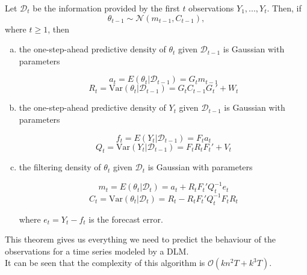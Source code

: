 \documentclass{article}
\begin{document}
\begin{theorem}
Let $\mathcal{D}_t$ be the information provided by the first $t$ observations $Y_1, ..., Y_t$.
Then, if
$$\theta_{t-1} \sim \mathcal{N}(m_{t-1}, C_{t-1}),$$
where $t \ge 1$, then

\begin{enumerate}[(a)]

\item the one-step-ahead predictive density of $\theta_t$ given $\mathcal{D}_{t-1}$ is Gaussian with parameters

$$a_t = E(\theta_t|\mathcal{D}_{t-1}) = G_tm_{t-1}$$
$$R_t = \text{Var}(\theta_t|\mathcal{D}_{t-1}) = G_tC_{t-1}G_t' + W_t$$

\item the one-step-ahead predictive density of $Y_t$ given $\mathcal{D}_{t-1}$ is Gaussian with parameters

$$f_t = E(Y_t|\mathcal{D}_{t-1}) = F_ta_t$$
$$Q_t = \text{Var}(Y_t|\mathcal{D}_{t-1}) = F_tR_tF_t' + V_t$$

\item the filtering density of $\theta_t$ given $\mathcal{D}_t$ is Gaussian with parameters

$$m_t = E(\theta_t|\mathcal{D}_{t}) = a_t + R_tF_t'Q_t^{-1}e_t$$
$$C_t = \text{Var}(\theta_t|\mathcal{D}_{t}) = R_t - R_tF_t'Q_t^{-1}F_tR_t$$

where $e_t = Y_t-f_t$ is the forecast error.

\end{enumerate}

This theorem gives us everything we need to predict the behaviour of the observations for a time series modeled by a DLM. \\

It can be seen that the complexity of this algorithm is $\mathcal{O}(kn^2T + k^3T)$.

\end{theorem}



\end{document}
